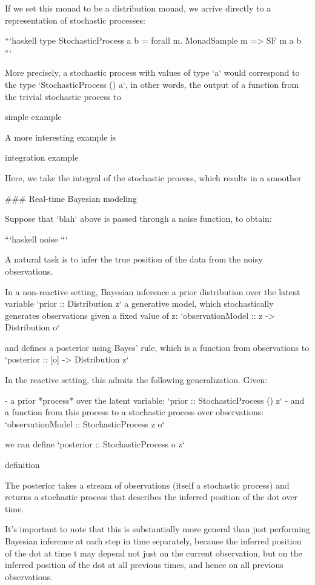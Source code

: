 If we set this monad to be a distribution monad, we arrive directly to a representation of stochastic processes:

```haskell
type StochasticProcess a b = forall m. MonadSample m => SF m a b
```

More precisely, a stochastic process with values of type `a` would correspond to the type `StochasticProcess () a`, in other words, the output of a function from the trivial stochastic process to

simple example

A more interesting example is

integration example

Here, we take the integral of the stochastic process, which results in a smoother

### Real-time Bayesian modeling

Suppose that `blah` 
    above is passed through a noise function, to obtain:

```haskell
noise
```

A natural task is to infer the true position of the data from the noisy observations.

In a non-reactive setting, Bayesian inference 
    a prior distribution over the latent variable `prior :: Distribution z` 
    a generative model, which stochastically generates observations given a fixed value of z: `observationModel :: z -> Distribution o`

and defines a posterior using Bayes' rule, which is a function from observations to `posterior :: [o] -> Distribution z`

In the reactive setting, this admits the following generalization. Given:

- a prior *process* over the latent variable: `prior :: StochasticProcess () z`
- and a function from this process to a stochastic process over observations: `observationModel :: StochasticProcess z o`

we can define `posterior :: StochasticProcess o z`

definition 

The posterior takes a stream of observations (itself a stochastic process) and returns a stochastic process that describes the inferred position of the dot over time.

It's important to note that this is substantially more general than just performing Bayesian inference at each step in time separately, because the inferred position of the dot at time t may depend not just on the current observation, but on the inferred position of the dot at all previous times, and hence on all previous observations.

